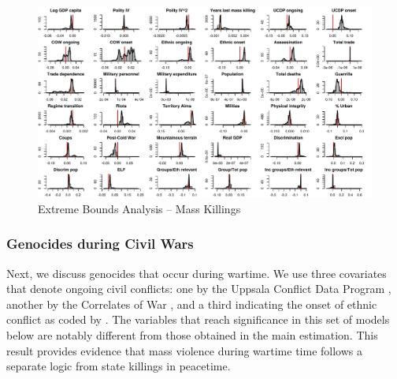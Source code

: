 \clearpage
\begin{figure}
    \centering
    \includegraphics[width=\textwidth]{images/mk.pdf}
    \caption{Extreme Bounds Analysis -- Mass Killings}
    \label{fig:mk}
\end{figure}
\clearpage

\subsubsection{Genocides during Civil Wars}
\label{sec:civil-wars}

Next, we discuss genocides that occur during wartime. We use three covariates that denote ongoing civil conflicts: one by the Uppsala Conflict Data Program \citep{allansson2017organized,gleditsch2002armed}, another by the Correlates of War \citep{sarkees2010resort}, and a third indicating the onset of ethnic conflict as coded by \citet{cederman2010ethnic}. The variables that reach significance in this set of models below are notably different from those obtained in the main estimation. This result provides evidence that mass violence during wartime time follows a separate logic from state killings in peacetime.

\vspace{1cm}


